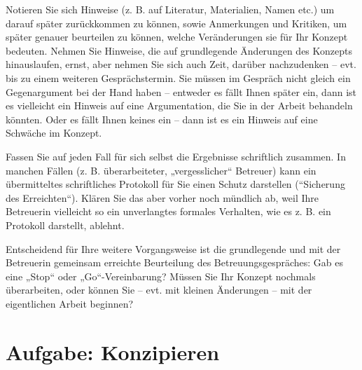 \documentclass[]{book}
\theoremstyle{definition}
\theoremstyle{definition}
\theoremstyle{definition}
\theoremstyle{remark}
\begin{document}
Notieren Sie sich Hinweise (z. B. auf Literatur, Materialien, Namen
etc.) um darauf später zurückkommen zu können, sowie Anmerkungen und
Kritiken, um später genauer beurteilen zu können, welche Veränderungen
sie für Ihr Konzept bedeuten. Nehmen Sie Hinweise, die auf grundlegende
Änderungen des Konzepts hinauslaufen, ernst, aber nehmen Sie sich auch
Zeit, darüber nachzudenken -- evt. bis zu einem weiteren
Gesprächstermin. Sie müssen im Gespräch nicht gleich ein Gegenargument
bei der Hand haben -- entweder es fällt Ihnen später ein, dann ist es
vielleicht ein Hinweis auf eine Argumentation, die Sie in der Arbeit
behandeln könnten. Oder es fällt Ihnen keines ein -- dann ist es ein
Hinweis auf eine Schwäche im Konzept.

Fassen Sie auf jeden Fall für sich selbst die Ergebnisse schriftlich
zusammen. In manchen Fällen (z. B. überarbeiteter, „vergesslicher``
Betreuer) kann ein übermitteltes schriftliches Protokoll für Sie einen
Schutz darstellen (``Sicherung des Erreichten``). Klären Sie das aber
vorher noch mündlich ab, weil Ihre Betreuerin vielleicht so ein
unverlangtes formales Verhalten, wie es z. B. ein Protokoll darstellt,
ablehnt.

Entscheidend für Ihre weitere Vorgangsweise ist die grundlegende und mit
der Betreuerin gemeinsam erreichte Beurteilung des Betreuungsgespräches:
Gab es eine „Stop`` oder „Go``-Vereinbarung? Müssen Sie Ihr Konzept
nochmals überarbeiten, oder können Sie -- evt. mit kleinen Änderungen --
mit der eigentlichen Arbeit beginnen?

\section{Aufgabe: Konzipieren}\label{aufgabe-konzipieren}
\end{document}
